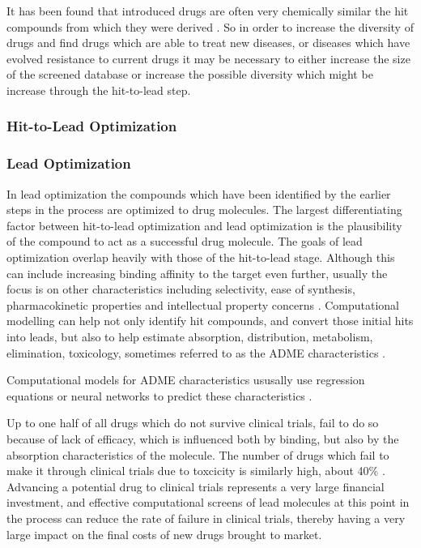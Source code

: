 It has been found that introduced drugs are often very chemically similar the hit compounds from which they were derived \cite{proudfoot2002drugs}.
So in order to increase the diversity of drugs and find drugs which are able to treat new diseases, or diseases which have evolved resistance to current drugs it may be necessary to either increase the size of the screened database or increase the possible diversity which might be increase through the hit-to-lead step.

\subsubsection{Hit-to-Lead Optimization}
\label{subsubsection:hit_to_lead}


\subsubsection{Lead Optimization}
\label{subsubsection:lead_optimization}
In lead optimization the compounds which have been identified by the earlier steps in the process are optimized to drug molecules.
The largest differentiating factor between hit-to-lead optimization and lead optimization is the plausibility of the compound to act as a successful drug molecule.
The goals of lead optimization overlap heavily with those of the hit-to-lead stage.
Although this can include increasing binding affinity to the target even further, usually the focus is on other characteristics including selectivity, ease of synthesis, pharmacokinetic properties and intellectual property concerns \cite{keserHu2006hit}.
Computational modelling can help not only identify hit compounds, and convert those initial hits into leads, but also to help estimate absorption, distribution, metabolism, elimination, toxicology, sometimes referred to as the ADME characteristics \cite{kerns2008drug}.

Computational models for ADME characteristics ususally use regression equations or neural networks to predict these characteristics \cite{jorgensen2004many}.

Up to one half of all drugs which do not survive clinical trials, fail to do so because of lack of efficacy, which is influenced both by binding, but also by the absorption characteristics of the molecule.
The number of drugs which fail to make it through clinical trials due to toxcicity is similarly high, about 40\% \cite{li2001screening}.
Advancing a potential drug to clinical trials represents a very large financial investment, and effective computational screens of lead molecules at this point in the process can reduce the rate of failure in clinical trials, thereby having a very large impact on the final costs of new drugs brought to market.
